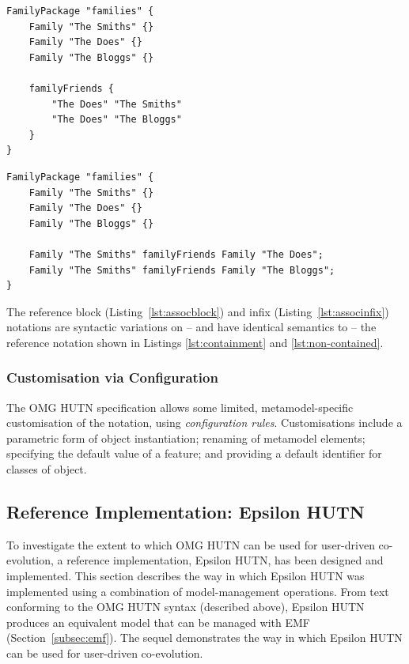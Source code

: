 \begin{lstlisting}[caption={[A reference block in HUTN]A reference block in HUTN, taken from \cite{rose08hutn}}, label=lst:assocblock, language=HutnFamilies]
FamilyPackage "families" {
    Family "The Smiths" {}
    Family "The Does" {}
    Family "The Bloggs" {}
    
    familyFriends {
        "The Does" "The Smiths"
        "The Does" "The Bloggs"
    }
}
\end{lstlisting}

\begin{lstlisting}[caption={[An infix reference in HUTN]An infix reference in HUTN, taken from \cite{rose08hutn}}, label=lst:associnfix, language=HutnFamilies]
FamilyPackage "families" {
    Family "The Smiths" {}
    Family "The Does" {}
    Family "The Bloggs" {}
    
    Family "The Smiths" familyFriends Family "The Does";
    Family "The Smiths" familyFriends Family "The Bloggs";
}
\end{lstlisting}

The reference block (Listing~\ref{lst:assocblock}) and infix (Listing~\ref{lst:associnfix}) notations are syntactic variations on -- and have identical semantics to -- the reference notation shown in Listings \ref{lst:containment} and \ref{lst:non-contained}.


\subsubsection{Customisation via Configuration}
The OMG HUTN specification allows some limited, metamodel-specific customisation of the notation, using \emph{configuration rules}. Customisations include a parametric form of object instantiation; renaming of metamodel elements; specifying the default value of a feature; and providing a default identifier for classes of object.


\subsection{Reference Implementation: Epsilon HUTN}
\label{subsec:epsilon_hutn}
To investigate the extent to which OMG HUTN can be used for user-driven co-evolution, a reference implementation, Epsilon HUTN, has been designed and implemented. This section describes the way in which Epsilon HUTN was implemented using a combination of model-management operations. From text conforming to the OMG HUTN syntax (described above), Epsilon HUTN produces an equivalent model that can be managed with EMF (Section~\ref{subsec:emf}). The sequel demonstrates the way in which Epsilon HUTN can be used for user-driven co-evolution.

